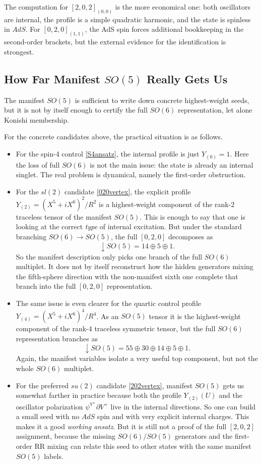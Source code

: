 \documentclass[12pt]{article}
\def\be{\begin{equation}}
\def\ee{\end{equation}}
\begin{document}
The computation for $[2,0,2]_{(0,0)}$ is the more economical one: both oscillators are
internal, the profile is a simple quadratic harmonic, and the state is spinless in $AdS$.
For $[0,2,0]_{(1,1)}$, the AdS spin forces additional bookkeeping in the second-order
brackets, but the external evidence for the identification is strongest.

\subsection{How Far Manifest \texorpdfstring{$SO(5)$}{SO(5)} Really Gets Us}

The manifest $SO(5)$ is sufficient to write down concrete highest-weight seeds, but it is not by itself
enough to certify the full $SO(6)$ representation, let alone Konishi membership.

For the concrete candidates above, the practical situation is as follows.
\begin{itemize}
\item For the spin-4 control \eqref{S4ansatz}, the internal profile is just $Y_{(0)}=1$. Here the loss of
full $SO(6)$ is not the main issue: the state is already an internal singlet. The real problem is dynamical,
namely the first-order obstruction.
\item For the $sl(2)$ candidate \eqref{020vertex}, the explicit profile
$Y_{(2)}=(X^5+iX^6)^2/R^2$ is a highest-weight component of the rank-2 traceless tensor of the manifest
$SO(5)$. This is enough to say that one is looking at the correct \emph{type} of internal excitation.
But under the standard branching $SO(6)\to SO(5)$, the full $[0,2,0]$ decomposes as
\be
[0,2,0]\downarrow SO(5)=14\oplus 5\oplus 1.
\ee
So the manifest description only picks one branch of the full $SO(6)$ multiplet. It does not by itself
reconstruct how the hidden generators mixing the fifth-sphere direction with the non-manifest sixth one
complete that branch into the full $[0,2,0]$ representation.
\item The same issue is even clearer for the quartic control profile
$Y_{(4)}=(X^5+iX^6)^4/R^4$. As an $SO(5)$ tensor it is the highest-weight component of the rank-4
traceless symmetric tensor, but the full $SO(6)$ representation branches as
\be
[0,4,0]\downarrow SO(5)=55\oplus 30\oplus 14\oplus 5\oplus 1.
\ee
Again, the manifest variables isolate a very useful top component, but not the whole $SO(6)$ multiplet.
\item For the preferred $su(2)$ candidate \eqref{202vertex}, manifest $SO(5)$ gets us somewhat farther in
practice because both the profile $Y_{(2)}(U)$ and the oscillator polarization
$\psi^{V^+}\partial V^+$ live in the internal directions. So one can build a small seed with no $AdS$ spin
and with very explicit internal charges. This makes it a good \emph{working ansatz}. But it is still not a
proof of the full $[2,0,2]$ assignment, because the missing $SO(6)/SO(5)$ generators and the first-order
RR mixing can relate this seed to other states with the same manifest $SO(5)$ labels.
\end{itemize}
\end{document}
